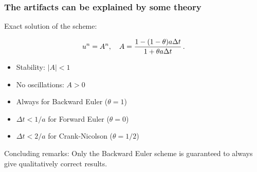 \documentclass{beamer}
\begin{document}
\begin{frame}
\frametitle{The artifacts can be explained by some theory}

\pause
Exact solution of the scheme:

\[ u^n = A^n,\quad A = \frac{1 - (1-\theta) a\Delta t}{1 + \theta a\Delta t}\thinspace .\]

\begin{itemize}
\pause
 \item Stability: $|A| < 1$

\pause
 \item No oscillations: $A>0$

\pause
 \item Always for Backward Euler ($\theta=1$)

\pause
 \item $\Delta t < 1/a$ for Forward Euler ($\theta=0$)

\pause
 \item $\Delta t < 2/a$ for Crank-Nicolson ($\theta=1/2$)
\end{itemize}

\noindent

\pause
\begin{block}{Concluding remarks: }
Only the Backward Euler scheme is guaranteed to always give
qualitatively correct results.
\end{block}
\end{frame}
\end{document}
